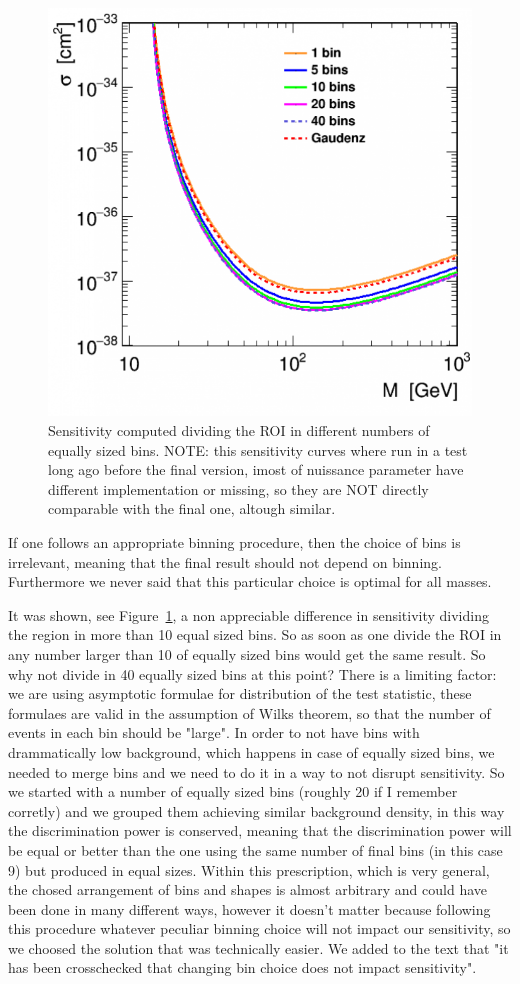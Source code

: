 \documentclass{article}
\begin{document}
\begin{figure}[t!]
  \centerline{\includegraphics[width=0.7\linewidth]{inelastic_binning_check.png}}
  \caption{ Sensitivity computed dividing the ROI in different numbers of equally sized bins. NOTE: this sensitivity curves where run in a test long ago before the final version, imost of nuissance parameter have different implementation or missing, so they are NOT directly comparable with the final one, altough similar.}
  \label{fig:binning}
\end{figure}

If one follows an appropriate binning procedure, then the choice of bins is irrelevant, meaning that 
the final result should not depend on binning. Furthermore we never said that this particular 
choice is optimal for all masses.

It was shown, see Figure~\ref{fig:binning}, a non appreciable
difference in sensitivity dividing the region in more than 10 equal sized bins. 
So as soon as one divide the ROI in any number larger than 10 of equally sized bins would get the same result. So why not divide in 40 equally sized bins at this point?  
There is a limiting factor: we are using asymptotic formulae for distribution of the
test statistic, these formulaes are valid in the assumption of Wilks theorem, so that the number
of events in each bin should be "large". In order to not have bins with drammatically low background, which
happens in case of equally sized bins, we needed to merge bins and we need to do it in a way to not disrupt sensitivity.
So we started with a number of equally sized bins (roughly 20 if I remember corretly) and we grouped them achieving similar 
background density,  in this way the discrimination power is conserved, meaning that the discrimination power will be equal or better than 
the one using the same number of final bins (in this case 9) but produced in equal sizes.
Within this prescription, which is very general, the chosed arrangement of bins and shapes is almost arbitrary and
could have been done in many different ways, however it doesn't matter because following 
this procedure whatever peculiar binning choice will not  impact  our 
sensitivity, so we choosed the solution that was technically easier.
We added to the text that "it has been crosschecked that changing bin choice does not impact sensitivity".
\end{document}
